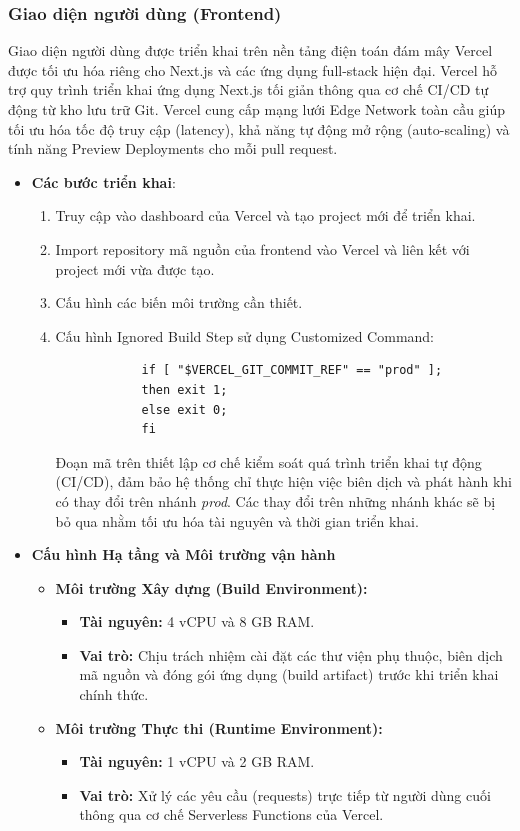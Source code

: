 \subsubsection{Giao diện người dùng (Frontend)}
Giao diện người dùng được triển khai trên nền tảng điện toán đám mây Vercel được tối ưu hóa riêng cho Next.js và các ứng dụng full-stack hiện đại. Vercel hỗ trợ quy trình triển khai ứng dụng Next.js tối giản thông qua cơ chế CI/CD tự động từ kho lưu trữ Git. Vercel cung cấp mạng lưới Edge Network toàn cầu giúp tối ưu hóa tốc độ truy cập (latency), khả năng tự động mở rộng (auto-scaling) và tính năng Preview Deployments cho mỗi pull request.
\begin{itemize}
	\item \textbf{Các bước triển khai}:
	\begin{enumerate}
		\item Truy cập vào dashboard của Vercel và tạo project mới để triển khai.
		\item Import repository mã nguồn của frontend vào Vercel và liên kết với project mới vừa được tạo.
		\item Cấu hình các biến môi trường cần thiết.
		\item Cấu hình Ignored Build Step sử dụng Customized Command:
		\begin{verbatim}
			if [ "$VERCEL_GIT_COMMIT_REF" == "prod" ]; 
			then exit 1; 
			else exit 0; 
			fi
		\end{verbatim}
		Đoạn mã trên thiết lập cơ chế kiểm soát quá trình triển khai tự động (CI/CD), đảm bảo hệ thống chỉ thực hiện việc biên dịch và phát hành khi có thay đổi trên nhánh \textit{prod}. Các thay đổi trên những nhánh khác sẽ bị bỏ qua nhằm tối ưu hóa tài nguyên và thời gian triển khai.
	\end{enumerate}
	\item \textbf{Cấu hình Hạ tầng và Môi trường vận hành}
	\begin{itemize}
		\item \textbf{Môi trường Xây dựng (Build Environment):}
		\begin{itemize}
			\item \textbf{Tài nguyên:} 4 vCPU và 8 GB RAM.
			\item \textbf{Vai trò:} Chịu trách nhiệm cài đặt các thư viện phụ thuộc, biên dịch mã nguồn và đóng gói ứng dụng (build artifact) trước khi triển khai chính thức.
		\end{itemize}
		
		\item \textbf{Môi trường Thực thi (Runtime Environment):}
		\begin{itemize}
			\item \textbf{Tài nguyên:} 1 vCPU và 2 GB RAM.
			\item \textbf{Vai trò:} Xử lý các yêu cầu (requests) trực tiếp từ người dùng cuối thông qua cơ chế Serverless Functions của Vercel.
		\end{itemize}
		

\end{itemize}
\end{itemize}

